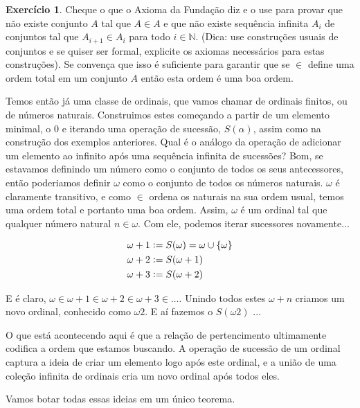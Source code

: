 \documentclass[11pt]{article}
\newcommand{\defeq}{\vcentcolon=}
\newcommand{\luamedio}{
\emoji{first-quarter-moon}
}
\theoremstyle{definition}
\theoremstyle{definition}
\theoremstyle{definition}
\theoremstyle{definition}
\theoremstyle{definition}
\theoremstyle{definition}
\theoremstyle{definition}
\theoremstyle{definition}
\theoremstyle{definition}
\theoremstyle{definition}
\theoremstyle{definition}
\theoremstyle{definition}
\theoremstyle{definition}
\newtheorem{exersisio}{Exercício}
\newenvironment{exercicio}{
\definecolor{shadecolor}{HTML}{CFB5FF}
\begin{shaded}
\begin{exersisio}
}
{
\end{exersisio}
\end{shaded}
}
\begin{document}
\begin{exercicio}
  \luamedio Cheque o que o Axioma da Fundação diz e o use para provar que não existe conjunto $A$ tal que $A \in A$ e que não existe sequência infinita $A_i$ de conjuntos tal que $A_{i+1} \in A_i$ para todo $i \in \mathbb{N}$. (Dica: use construções usuais de conjuntos e se quiser ser formal, explicite os axiomas necessários para estas construções). Se convença que isso é suficiente para garantir que se $\in$ define uma ordem total em um conjunto $A$ então esta ordem é uma boa ordem.
\end{exercicio}

Temos então já uma classe de ordinais, que vamos chamar de ordinais finitos, ou de números naturais. Construimos estes começando a partir de um elemento minimal, o $0$ e iterando uma operação de sucessão, $S(\alpha)$, assim como na construção dos exemplos anteriores. Qual é o análogo da operação de adicionar um elemento ao infinito após uma sequência infinita de sucessões? Bom, se estavamos definindo um número como o conjunto de todos os seus antecessores, então poderiamos definir $\omega$ como o conjunto de todos os números naturais. $\omega$ é claramente transitivo, e como $\in$ ordena os naturais na sua ordem usual, temos uma ordem total e portanto uma boa ordem. Assim, $\omega$ é um ordinal tal que qualquer número natural $n \in \omega$. Com ele, podemos iterar sucessores novamente...

\begin{align*}
  \omega + 1 &\defeq S(\omega) = \omega \cup \{\omega\} \\
  \omega + 2 &\defeq S(\omega + 1) \\
  \omega + 3 &\defeq S(\omega + 2)
\end{align*}

E é claro, $\omega \in \omega + 1 \in \omega + 2 \in \omega + 3 \in \dots$. Unindo todos estes $\omega + n$ criamos um novo ordinal, conhecido como $\omega 2$. E aí fazemos o $S(\omega 2)$ ...

O que está acontecendo aqui é que a relação de pertencimento ultimamente codifica a ordem que estamos buscando. A operação de sucessão de um ordinal captura a ideia de criar um elemento logo após este ordinal, e a união de uma coleção infinita de ordinais cria um novo ordinal após todos eles. 

Vamos botar todas essas ideias em um único teorema.
\end{document}
